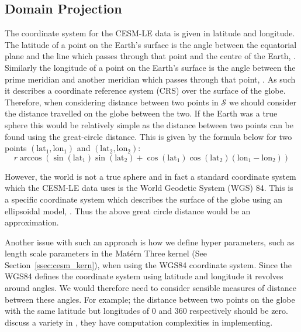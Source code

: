 \subsection{Domain Projection \label{ssec:spatial_projection}}
The coordinate system for the CESM-LE data is given in latitude and longitude.
The latitude of a point on the Earth's surface is the angle between the equatorial plane and the line which passes through that point and the centre of the Earth, \citep{lu_geodetic_2014}.
Similarly the longitude of a point on the Earth's surface is the angle between the prime meridian and another meridian which passes through that point, \citep{lu_geodetic_2014}.
As such it describes a coordinate reference system (CRS) over the surface of the globe.
Therefore, when considering distance between two points in $\mathcal{S}$ we should consider the distance travelled on the globe between the two.
If the Earth was a true sphere this would be relatively simple as the distance between two points can be found using the great-circle distance.
This is given by the formula below for two points $\left(\text{lat}_1, \text{lon}_1\right)$ and $\left(\text{lat}_2, \text{lon}_2\right)$: 
\begin{equation}
	r \arccos\left(\sin(\text{lat}_1) \sin(\text{lat}_2) + \cos(\text{lat}_1) \cos(\text{lat}_2) \left( \text{lon}_1 - \text{lon}_2\right)\right)
\end{equation}

However, the world is not a true sphere and in fact a standard coordinate system which the CESM-LE data uses is the World Geodetic System (WGS) 84. 
This is a specific coordinate system which describes the surface of the globe using an ellipsoidal model, \citep{lu_geodetic_2014}. 
Thus the above great circle distance would be an approximation. 

Another issue with such an approach is how we define hyper parameters, such as length scale parameters in the Mat\'ern Three kernel (See Section~\ref{ssec:cesm_kern}), when using the WGS84 coordinate system.
Since the WGS84 defines the coordinate system using latitude and longitude it revolves around angles.
We would therefore need to consider sensible measures of distance between these angles.
For example; the distance between two points on the globe with the same latitude but longitudes of $0$ and $360$ respectively should be zero.
\citeauthor{guinness_isotropic_2016} discuss a variety in \citep{guinness_isotropic_2016}, they have computation complexities in implementing.

